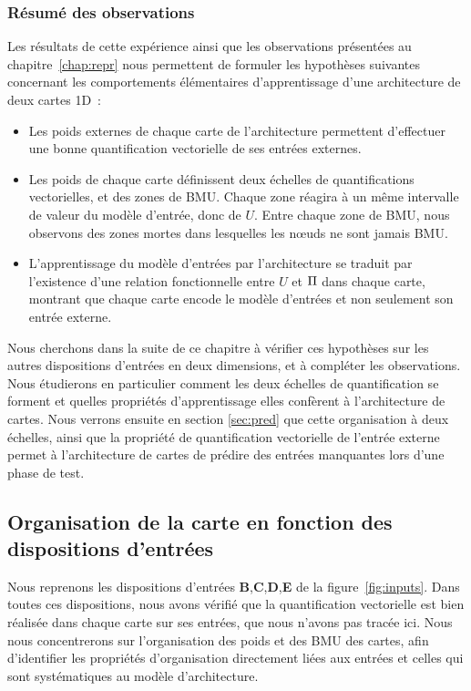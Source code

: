 \documentclass[../main]{subfiles}
\begin{document}
\subsubsection{Résumé des observations}

Les résultats de cette expérience ainsi que les observations présentées au chapitre~\ref{chap:repr} nous permettent de formuler les hypothèses suivantes concernant les comportements élémentaires d'apprentissage d'une architecture de deux cartes 1D~:

\begin{itemize}
	\item Les poids externes de chaque carte de l'architecture permettent d'effectuer une bonne quantification vectorielle de ses entrées externes.
	\item Les poids de chaque carte définissent deux échelles de quantifications vectorielles, et des zones de BMU.
	Chaque zone réagira à un même intervalle de valeur du modèle d'entrée, donc de $U$.
	Entre chaque zone de BMU, nous observons des zones mortes dans lesquelles les n\oe{}uds ne sont jamais BMU.
	\item L'apprentissage du modèle d'entrées par l'architecture se traduit par l'existence d'une relation fonctionnelle entre $U$ et $\Pi$ dans chaque carte, montrant que chaque carte encode le modèle d'entrées et non seulement son entrée externe.
\end{itemize}

Nous cherchons dans la suite de ce chapitre à vérifier ces hypothèses sur les autres dispositions d'entrées en deux dimensions, et à compléter les observations.
Nous étudierons en particulier comment les deux échelles de quantification se forment et quelles propriétés d'apprentissage elles confèrent à l'architecture de cartes.
Nous verrons ensuite en section \ref{sec:pred} que cette organisation à deux échelles, ainsi que la propriété de quantification vectorielle de l'entrée externe permet à l'architecture de cartes de prédire des entrées manquantes lors d'une phase de test.

\subsection{Organisation de la carte en fonction des dispositions d'entrées}

Nous reprenons les dispositions d'entrées \textbf{B},\textbf{C},\textbf{D},\textbf{E} de la figure~\ref{fig:inputs}.
Dans toutes ces dispositions, nous avons vérifié que la quantification vectorielle est bien réalisée dans chaque carte sur ses entrées, que nous n'avons pas tracée ici.
Nous nous concentrerons sur l'organisation des poids et des BMU des cartes, afin d'identifier les propriétés d'organisation directement liées aux entrées et celles qui sont systématiques au modèle d'architecture.
\end{document}
